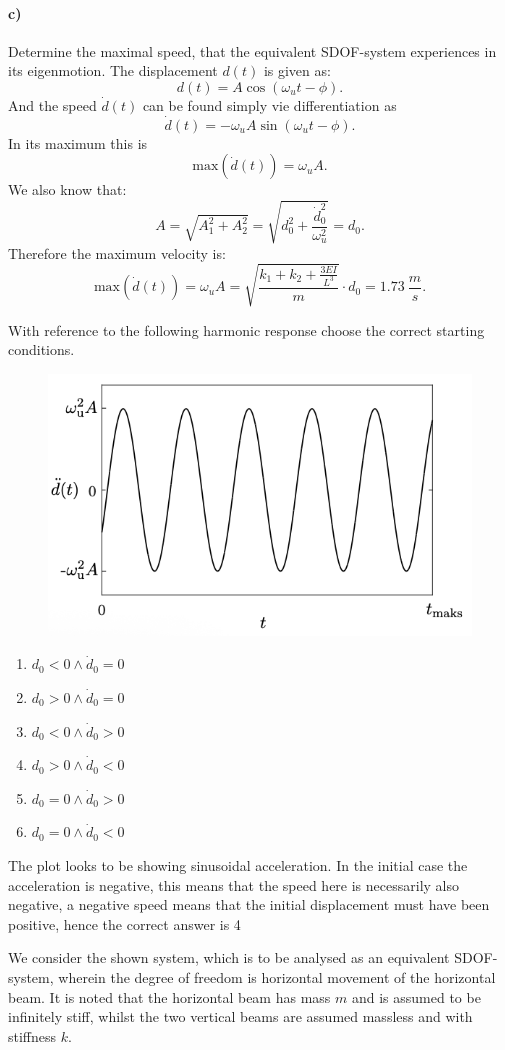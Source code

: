 \paragraph{c)}
Determine the maximal speed, that the equivalent SDOF-system experiences in its eigenmotion.
\bigbreak
The displacement $d(t)$ is given as:
\[ 
d(t) = A \cos \left( \omega_u t - \phi \right)
.\]
And the speed $\dot{d}(t)$ can be found simply vie differentiation as
\[ 
\dot{d}(t) = - \omega_u A \sin \left( \omega_u t - \phi \right)
.\]
In its maximum this is
\[ 
\mathrm{max}(\dot{d}(t)) = \omega_u A
.\]
We also know that:
\[ 
A = \sqrt{A_1^2 + A_2^2} = \sqrt{d_0^2 + \frac{\dot{d}_0^2}{\omega_u^2}} = d_0
.\]
Therefore the maximum velocity is:
\[ 
\mathrm{max} \left( \dot{d} (t) \right) = \omega_u A = \sqrt{\frac{k_1 + k_2 + \frac{3EI}{L^3}}{m}} \cdot d_0 = \qty{1,73}{\frac{m}{s}}
.\]



With reference to the following harmonic response choose the correct starting conditions.

\begin{figure} [ht]
  \centering
  \includegraphics[width=0.35\linewidth]{./figures/f2_2.png}
\end{figure}

\begin{enumerate}
  \item $d_0 < 0 \wedge \dot{d}_0 = 0$
  \item $d_0 > 0 \wedge \dot{d}_0 = 0$
  \item $d_0 < 0 \wedge \dot{d}_0 > 0$
  \item $d_0 > 0 \wedge \dot{d}_0 < 0$
  \item $d_0 = 0 \wedge \dot{d}_0 > 0$
  \item $d_0 = 0 \wedge \dot{d}_0 < 0$
\end{enumerate}
\bigbreak
The plot looks to be showing sinusoidal acceleration. In the initial case the acceleration is negative, this means that the speed here is necessarily also negative, a negative speed means that the initial displacement must have been positive, hence the correct answer is 4


We consider the shown system, which is to be analysed as an equivalent SDOF-system, wherein the degree of freedom is horizontal movement of the horizontal beam. It is noted that the horizontal beam has mass $m$ and is assumed to be infinitely stiff, whilst the two vertical beams are assumed massless and with stiffness $k$.

